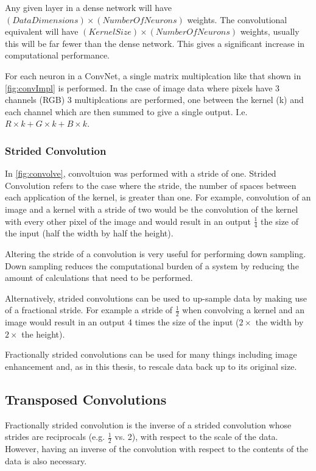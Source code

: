 Any given layer in a dense network will have $(Data Dimensions) \times (Number Of Neurons)$ weights. The convolutional equivalent will have $(Kernel Size) \times (Number Of Neurons)$ weights, usually this will be far fewer than the dense network. This gives a significant increase in computational performance.

For each neuron in a \ac{ConvNet}, a single matrix multiplcation like that shown in \autoref{fig:convImpl} is performed. In the case of image data where pixels have 3 channels (RGB) 3 multiplcations are performed, one between the kernel (k) and each channel which are then summed to give a single output. I.e. $R\times k + G\times k + B\times k$.

\subsubsection{Strided Convolution}
In \autoref{fig:convolve}, convoltuion was performed with a stride of one. Strided Convolution refers to the case where the stride, the number of spaces between each application of the kernel, is greater than one. For example, convolution of an image and a kernel with a stride of two would be the convolution of the kernel with every other pixel of the image and would result in an output $\frac{1}{4}$ the size of the input (half the width by half the height).

Altering the stride of a convolution is very useful for performing down sampling. Down sampling reduces the computational burden of a system by reducing the amount of calculations that need to be performed.

Alternatively, strided convolutions can be used to up-sample data by making use of a fractional stride. For example a stride of $\frac{1}{2}$ when convolving a kernel and an image would result in an output 4 times the size of the input ($2\times$ the width by $2\times$ the height).

Fractionally strided convolutions can be used for many things including image enhancement \cite{radford2015unsupervised} and, as in this thesis, to rescale data back up to its original size.

\subsection{Transposed Convolutions}
Fractionally strided convolution is the inverse of a strided convolution whose strides are reciprocals (e.g. $\frac{1}{2}$ vs. 2), with respect to the scale of the data. However, having an inverse of the convolution with respect to the contents of the data is also necessary.

